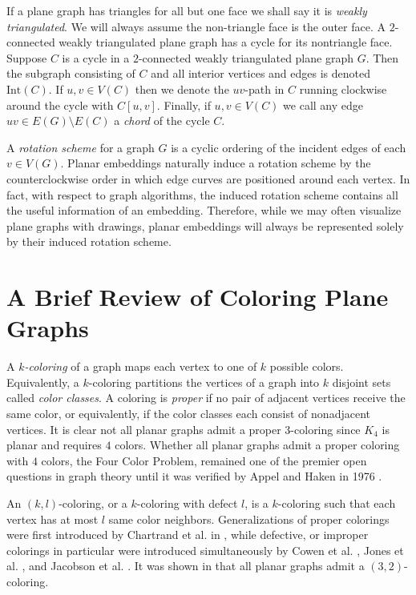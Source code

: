 \documentclass[letterpaper, 12pt]{amsart}
\theoremstyle{definition}
\theoremstyle{definition}
\theoremstyle{thm}
\theoremstyle{definition}
\begin{document}
If a plane graph has triangles for all but one face we shall say it is
\textit{weakly triangulated}. We will always assume the non-triangle face is the
outer face. A $2$-connected weakly triangulated plane graph has a cycle for its
nontriangle face. Suppose $C$ is a cycle in a $2$-connected weakly
triangulated plane graph $G$. Then the subgraph consisting of $C$ and all interior
vertices and edges is denoted $\text{Int}(C)$. If $u,v \in V(C)$ then we denote the $uv$-path in $C$ running
clockwise around the cycle with $C[u,v]$. Finally, if $u,v\in V(C)$ we call any
edge $uv \in E(G)\setminus E(C)$ a \textit{chord} of the cycle $C$.

A \textit{rotation scheme} for a graph $G$ is a cyclic ordering of the incident
edges of each $v\in V(G)$. Planar embeddings naturally induce a rotation
scheme by the counterclockwise order in which edge curves are positioned around
each vertex. In fact, with respect to graph algorithms, the induced rotation
scheme contains all the useful information of an embedding. Therefore, while we
may often visualize plane
graphs with drawings, planar embeddings will always be represented solely by
their induced rotation scheme.

\section{A Brief Review of Coloring Plane Graphs}

A $k$\textit{-coloring} of a graph maps each vertex to one of $k$ possible
colors. Equivalently, a $k$-coloring partitions the vertices of a graph into $k$
disjoint sets called \textit{color classes}. 
A coloring is \textit{proper} if no pair of adjacent vertices receive the same
color, or equivalently, if the color classes each consist of nonadjacent vertices. It
is clear not all planar graphs admit a proper $3$-coloring since $K_4$ is planar
and requires $4$ colors. Whether all planar graphs admit a proper coloring with
$4$ colors, the Four Color Problem, remained one of the premier open questions
in graph theory until it was verified by Appel and Haken in 1976
\cite{appel1, appel2}.

An $(k,l)$-coloring, or a $k$-coloring with defect $l$, is a
$k$-coloring such that each vertex has at most $l$ same color neighbors.
Generalizations of proper colorings were first introduced by Chartrand et al. in
\cite{chartrand}, while defective, or improper colorings in particular were introduced
simultaneously by Cowen et al. \cite{cowen}, Jones et al. \cite{jones}, and
Jacobson et al. \cite{jacobson}. It was shown in \cite{cowen} that all
planar graphs admit a $(3,2)$-coloring.
\end{document}

